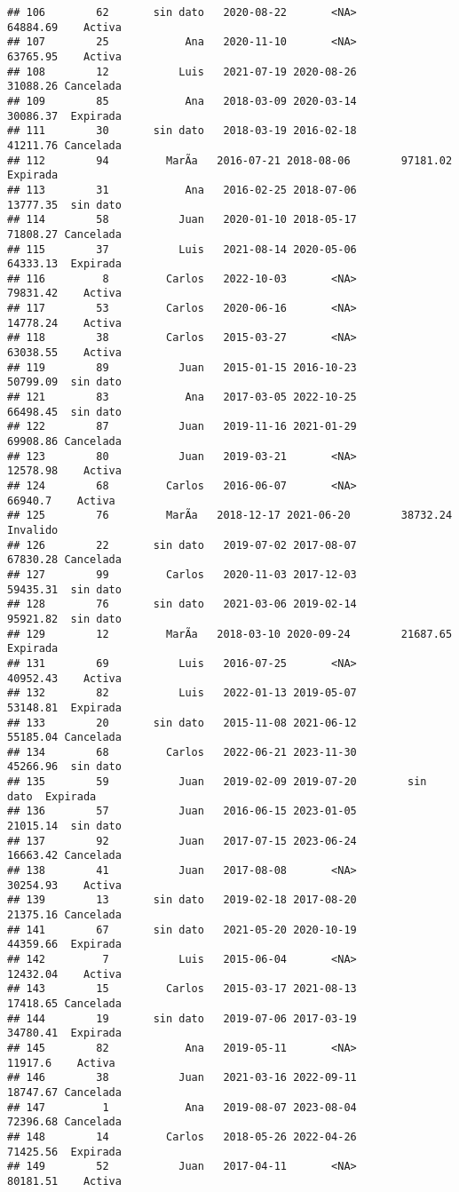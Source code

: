 \documentclass[
]{article}
\begin{document}
\begin{verbatim}
## 106        62       sin dato   2020-08-22       <NA>        64884.69    Activa
## 107        25            Ana   2020-11-10       <NA>        63765.95    Activa
## 108        12           Luis   2021-07-19 2020-08-26        31088.26 Cancelada
## 109        85            Ana   2018-03-09 2020-03-14        30086.37  Expirada
## 111        30       sin dato   2018-03-19 2016-02-18        41211.76 Cancelada
## 112        94         MarÃ­a   2016-07-21 2018-08-06        97181.02  Expirada
## 113        31            Ana   2016-02-25 2018-07-06        13777.35  sin dato
## 114        58           Juan   2020-01-10 2018-05-17        71808.27 Cancelada
## 115        37           Luis   2021-08-14 2020-05-06        64333.13  Expirada
## 116         8         Carlos   2022-10-03       <NA>        79831.42    Activa
## 117        53         Carlos   2020-06-16       <NA>        14778.24    Activa
## 118        38         Carlos   2015-03-27       <NA>        63038.55    Activa
## 119        89           Juan   2015-01-15 2016-10-23        50799.09  sin dato
## 121        83            Ana   2017-03-05 2022-10-25        66498.45  sin dato
## 122        87           Juan   2019-11-16 2021-01-29        69908.86 Cancelada
## 123        80           Juan   2019-03-21       <NA>        12578.98    Activa
## 124        68         Carlos   2016-06-07       <NA>         66940.7    Activa
## 125        76         MarÃ­a   2018-12-17 2021-06-20        38732.24  Invalido
## 126        22       sin dato   2019-07-02 2017-08-07        67830.28 Cancelada
## 127        99         Carlos   2020-11-03 2017-12-03        59435.31  sin dato
## 128        76       sin dato   2021-03-06 2019-02-14        95921.82  sin dato
## 129        12         MarÃ­a   2018-03-10 2020-09-24        21687.65  Expirada
## 131        69           Luis   2016-07-25       <NA>        40952.43    Activa
## 132        82           Luis   2022-01-13 2019-05-07        53148.81  Expirada
## 133        20       sin dato   2015-11-08 2021-06-12        55185.04 Cancelada
## 134        68         Carlos   2022-06-21 2023-11-30        45266.96  sin dato
## 135        59           Juan   2019-02-09 2019-07-20        sin dato  Expirada
## 136        57           Juan   2016-06-15 2023-01-05        21015.14  sin dato
## 137        92           Juan   2017-07-15 2023-06-24        16663.42 Cancelada
## 138        41           Juan   2017-08-08       <NA>        30254.93    Activa
## 139        13       sin dato   2019-02-18 2017-08-20        21375.16 Cancelada
## 141        67       sin dato   2021-05-20 2020-10-19        44359.66  Expirada
## 142         7           Luis   2015-06-04       <NA>        12432.04    Activa
## 143        15         Carlos   2015-03-17 2021-08-13        17418.65 Cancelada
## 144        19       sin dato   2019-07-06 2017-03-19        34780.41  Expirada
## 145        82            Ana   2019-05-11       <NA>         11917.6    Activa
## 146        38           Juan   2021-03-16 2022-09-11        18747.67 Cancelada
## 147         1            Ana   2019-08-07 2023-08-04        72396.68 Cancelada
## 148        14         Carlos   2018-05-26 2022-04-26        71425.56  Expirada
## 149        52           Juan   2017-04-11       <NA>        80181.51    Activa
\end{verbatim}
\end{document}
